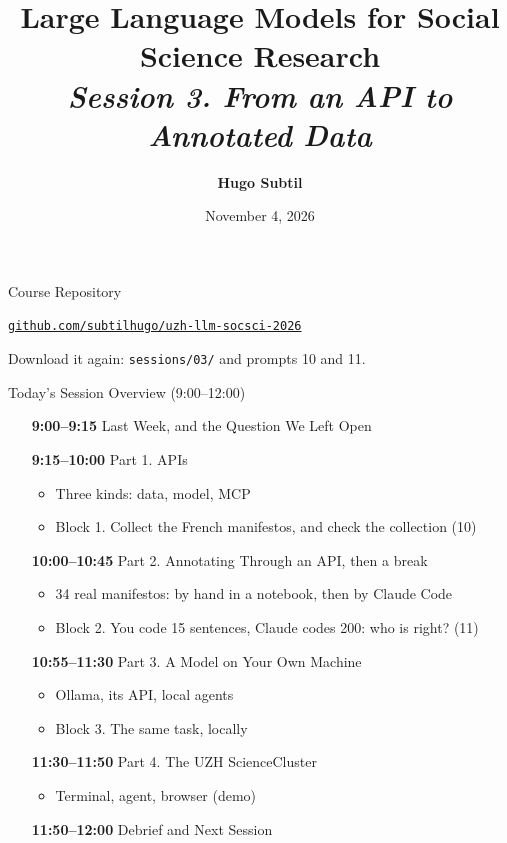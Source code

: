 \documentclass[svgnames,x11names,dvipsnames]{beamer}
\title[LLMs for Social Science Research]{\large \textbf{Large Language Models for Social Science Research} \\
    \textit{Session 3. From an API to Annotated Data}}
\author[H. Subtil]{\textbf{Hugo Subtil}}
\institute{PhD Workshop, University of Zurich}
\date{November 4, 2026}
\newcommand{\chg}[1]{{\bfseries #1}}
\renewcommand{\chg}[1]{#1}
\begin{document}
\frame{\titlepage}

\begin{frame}{Course Repository}
\centering
\vspace{0.2cm}

\vspace{0.5cm}
{\large \href{https://github.com/subtilhugo/uzh-llm-socsci-2026}{\texttt{github.com/subtilhugo/uzh-llm-socsci-2026}}}

\vspace{0.4cm}
{\small Download it again: \texttt{sessions/03/} and prompts 10 and 11.}
\end{frame}

\begin{frame}{\chg{Today's Session Overview (9:00--12:00)}}

\setlength{\leftmargini}{2.3cm}
\small
\begin{enumerate}
    \setlength{\itemsep}{1pt}
    \item[\textbf{9:00--9:15}] Last Week, and the Question We Left Open

    \item[\textbf{9:15--10:00}] Part 1. APIs
    \begin{itemize}
        \item Three kinds: data, model, MCP
        \item Block 1. Collect the French manifestos, and check the collection (10)
    \end{itemize}

    \item[\textbf{10:00--10:45}] Part 2. Annotating Through an API, then a break
    \begin{itemize}
        \item \chg{34 real manifestos: by hand in a notebook, then by Claude Code}
        \item Block 2. You code 15 sentences, Claude codes 200: who is right? (11)
    \end{itemize}

    \item[\textbf{10:55--11:30}] Part 3. A Model on Your Own Machine
    \begin{itemize}
        \item Ollama, its API, local agents
        \item Block 3. The same task, locally
    \end{itemize}

    \item[\textbf{11:30--11:50}] Part 4. The UZH ScienceCluster
    \begin{itemize}
        \item Terminal, agent, browser (demo)
    \end{itemize}

    \item[\textbf{11:50--12:00}] Debrief and Next Session
\end{enumerate}

\end{frame}
\end{document}
